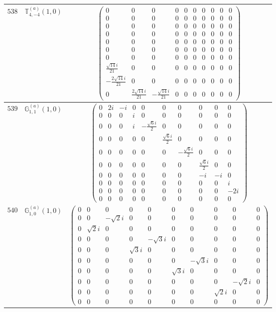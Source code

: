 \documentclass[fleqn,8pt,landscape]{jsarticle}
\begin{document}
\begin{center}
\begin{longtable}{ccc}
$ 538 $ & $ \mathbb{T}_{4,-4}^{(a)}(1,0) $ & $ \begin{pmatrix} 0 & 0 & 0 & 0 & 0 & 0 & 0 & 0 & 0 & 0 \\ 0 & 0 & 0 & 0 & 0 & 0 & 0 & 0 & 0 & 0 \\ 0 & 0 & 0 & 0 & 0 & 0 & 0 & 0 & 0 & 0 \\ 0 & 0 & 0 & 0 & 0 & 0 & 0 & 0 & 0 & 0 \\ 0 & 0 & 0 & 0 & 0 & 0 & 0 & 0 & 0 & 0 \\ 0 & 0 & 0 & 0 & 0 & 0 & 0 & 0 & 0 & 0 \\ 0 & 0 & 0 & 0 & 0 & 0 & 0 & 0 & 0 & 0 \\ \frac{\sqrt{14} i}{21} & 0 & 0 & 0 & 0 & 0 & 0 & 0 & 0 & 0 \\ - \frac{2 \sqrt{14} i}{21} & 0 & 0 & 0 & 0 & 0 & 0 & 0 & 0 & 0 \\ 0 & \frac{2 \sqrt{14} i}{21} & - \frac{\sqrt{14} i}{21} & 0 & 0 & 0 & 0 & 0 & 0 & 0 \end{pmatrix} $ \\ \hline
$ 539 $ & $ \mathbb{G}_{1,1}^{(a)}(1,0) $ & $ \begin{pmatrix} 0 & 2 i & - i & 0 & 0 & 0 & 0 & 0 & 0 & 0 \\ 0 & 0 & 0 & i & 0 & 0 & 0 & 0 & 0 & 0 \\ 0 & 0 & 0 & i & - \frac{\sqrt{6} i}{2} & 0 & 0 & 0 & 0 & 0 \\ 0 & 0 & 0 & 0 & 0 & \frac{\sqrt{6} i}{2} & 0 & 0 & 0 & 0 \\ 0 & 0 & 0 & 0 & 0 & 0 & - \frac{\sqrt{6} i}{2} & 0 & 0 & 0 \\ 0 & 0 & 0 & 0 & 0 & 0 & 0 & \frac{\sqrt{6} i}{2} & 0 & 0 \\ 0 & 0 & 0 & 0 & 0 & 0 & 0 & - i & - i & 0 \\ 0 & 0 & 0 & 0 & 0 & 0 & 0 & 0 & 0 & i \\ 0 & 0 & 0 & 0 & 0 & 0 & 0 & 0 & 0 & - 2 i \\ 0 & 0 & 0 & 0 & 0 & 0 & 0 & 0 & 0 & 0 \end{pmatrix} $ \\ \hline
$ 540 $ & $ \mathbb{G}_{1,0}^{(a)}(1,0) $ & $ \begin{pmatrix} 0 & 0 & 0 & 0 & 0 & 0 & 0 & 0 & 0 & 0 \\ 0 & 0 & - \sqrt{2} i & 0 & 0 & 0 & 0 & 0 & 0 & 0 \\ 0 & \sqrt{2} i & 0 & 0 & 0 & 0 & 0 & 0 & 0 & 0 \\ 0 & 0 & 0 & 0 & - \sqrt{3} i & 0 & 0 & 0 & 0 & 0 \\ 0 & 0 & 0 & \sqrt{3} i & 0 & 0 & 0 & 0 & 0 & 0 \\ 0 & 0 & 0 & 0 & 0 & 0 & - \sqrt{3} i & 0 & 0 & 0 \\ 0 & 0 & 0 & 0 & 0 & \sqrt{3} i & 0 & 0 & 0 & 0 \\ 0 & 0 & 0 & 0 & 0 & 0 & 0 & 0 & - \sqrt{2} i & 0 \\ 0 & 0 & 0 & 0 & 0 & 0 & 0 & \sqrt{2} i & 0 & 0 \\ 0 & 0 & 0 & 0 & 0 & 0 & 0 & 0 & 0 & 0 \end{pmatrix} $ \\ \hline

\end{longtable}
\end{center}
\end{document}
